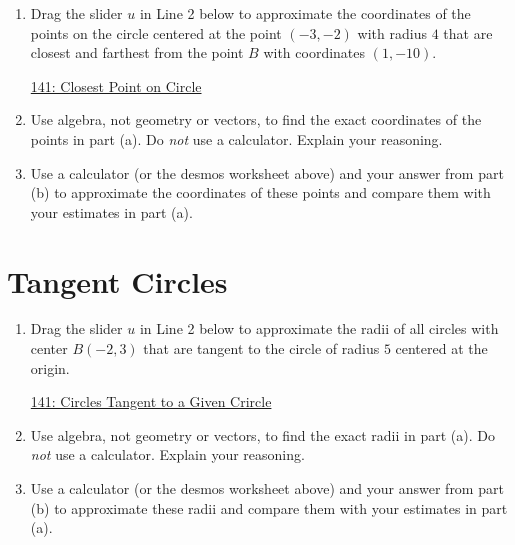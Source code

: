 \documentclass{ximera}
\begin{document}
\begin{question}  \label{QKdferedr4333}
\begin{enumerate}

\item Drag the slider $u$ in Line 2 below to approximate the coordinates of the points on the circle centered at the point $(-3,-2)$ with radius $4$ that are closest and farthest from the point $B$ with coordinates $(1,-10)$.

\begin{onlineOnly}
    \begin{center}
\end{center}
\end{onlineOnly}

\href{https://www.desmos.com/calculator/zdfejl3mpy}{141: Closest Point on Circle}

\item Use algebra, not geometry or vectors, to find the exact coordinates of the points in part (a). Do \emph{not} use a calculator. Explain your reasoning.

\item Use a calculator (or the desmos worksheet above) and your answer from part (b) to approximate the coordinates of these points and compare them with your estimates in part (a).

\end{enumerate}
\end{question}

\section{Tangent Circles}

\begin{question}  \label{QKdferedr4333}
\begin{enumerate}

\item Drag the slider $u$ in Line 2 below to approximate the radii of all circles with center $B(-2,3)$ that are tangent to the circle of radius $5$ centered at the origin.

\begin{onlineOnly}
    \begin{center}
\end{center}
\end{onlineOnly}

\href{https://www.desmos.com/calculator/6yotul255q}{141: Circles Tangent to a Given Crircle}

\item Use algebra, not geometry or vectors, to find the exact radii in part (a). Do \emph{not} use a calculator. Explain your reasoning.

\item Use a calculator (or the desmos worksheet above) and your answer from part (b) to approximate these radii and compare them with your estimates in part (a).

\end{enumerate}
\end{question}
\end{document}
